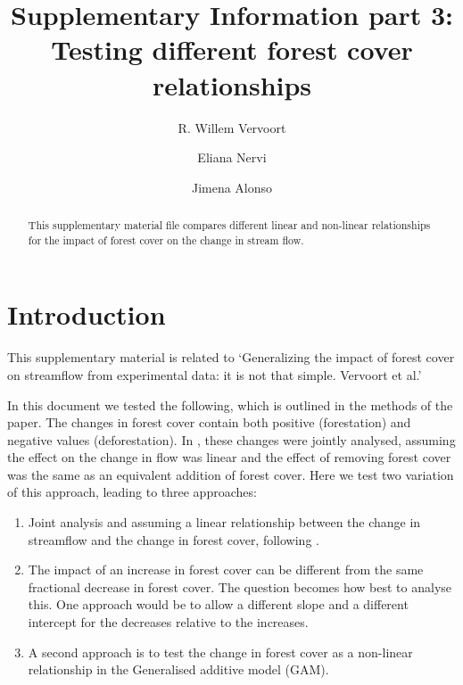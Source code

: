 \documentclass[]{elsarticle} %
\providecommand{\tightlist}{%
  \setlength{\itemsep}{0pt}\setlength{\parskip}{0pt}}
\begin{document}
\begin{frontmatter}

  \title{Supplementary Information part 3: Testing different forest cover relationships}
    \author[]{R. Willem Vervoort%
  }
    \author[]{Eliana Nervi}
    \author[]{Jimena Alonso}
  
  \begin{abstract}
  This supplementary material file compares different linear and non-linear relationships for the impact of forest cover on the change in stream flow.
  \end{abstract}
  
 \end{frontmatter}

\setcounter{table}{0} \renewcommand{\thetable}{S\arabic{table}} \setcounter{figure}{0} \renewcommand{\thefigure}{S\arabic{figure}}\setcounter{equation}{0} \renewcommand{\theequation}{S\arabic{equation}}

\hypertarget{introduction}{%
\section{Introduction}\label{introduction}}

This supplementary material is related to `Generalizing the impact of forest cover on streamflow from experimental data: it is not that simple. Vervoort et al.'

In this document we tested the following, which is outlined in the methods of the paper.
The changes in forest cover contain both positive (forestation) and negative values (deforestation). In \citet{zhang2017}, these changes were jointly analysed, assuming the effect on the change in flow was linear and the effect of removing forest cover was the same as an equivalent addition of forest cover. Here we test two variation of this approach, leading to three approaches:

\begin{enumerate}
\def\labelenumi{\arabic{enumi}.}
\tightlist
\item
  Joint analysis and assuming a linear relationship between the change in streamflow and the change in forest cover, following \citet{zhang2017}.
\item
  The impact of an increase in forest cover can be different from the same fractional decrease in forest cover. The question becomes how best to analyse this. One approach would be to allow a different slope and a different intercept for the decreases relative to the increases.
\item
  A second approach is to test the change in forest cover as a non-linear relationship in the Generalised additive model (GAM).
\end{enumerate}
\end{document}
